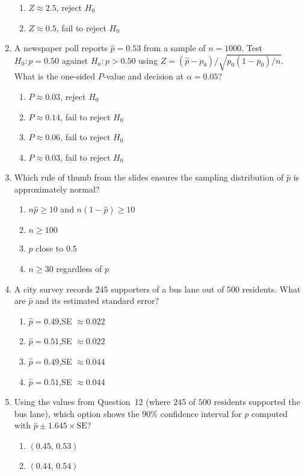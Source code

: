 \documentclass{article}
\begin{document}
\begin{enumerate}
\begin{enumerate}[label=(\Alph*)]
  \item $Z\approx2.5$, reject $H_0$
  \item $Z\approx0.5$, fail to reject $H_0$
  \end{enumerate}
\item A newspaper poll reports $\hat{p}=0.53$ from a sample of $n=1000$. Test $H_0:p=0.50$ against $H_a:p>0.50$ using $Z=(\hat{p}-p_0)/\sqrt{p_0(1-p_0)/n}$. What is the one-sided $P$-value and decision at $\alpha=0.05$?
  \begin{enumerate}[label=(\Alph*)]
  \item $P\approx0.03$, reject $H_0$
  \item $P\approx0.14$, fail to reject $H_0$
  \item $P\approx0.06$, fail to reject $H_0$
  \item $P\approx0.03$, fail to reject $H_0$
  \end{enumerate}
\item Which rule of thumb from the slides ensures the sampling distribution of $\hat{p}$ is approximately normal?
  \begin{enumerate}[label=(\Alph*)]
  \item $n\hat{p}\ge10$ and $n(1-\hat{p})\ge10$
  \item $n\ge100$
  \item $p$ close to $0.5$
  \item $n\ge30$ regardless of $p$
  \end{enumerate}
\item A city survey records $245$ supporters of a bus lane out of $500$ residents. What are $\hat{p}$ and its estimated standard error?
  \begin{enumerate}[label=(\Alph*)]
  \item $\hat{p}=0.49$,\quad SE $\approx0.022$
  \item $\hat{p}=0.51$,\quad SE $\approx0.022$
  \item $\hat{p}=0.49$,\quad SE $\approx0.044$
  \item $\hat{p}=0.51$,\quad SE $\approx0.044$
  \end{enumerate}
\item Using the values from Question~12 (where $245$ of $500$ residents supported the bus lane), which option shows the $90\%$ confidence interval for $p$ computed with $\hat{p}\pm1.645\times\text{SE}$?
  \begin{enumerate}[label=(\Alph*)]
  \item $(0.45,\,0.53)$
  \item $(0.44,\,0.54)$

\end{enumerate}
\end{enumerate}
\end{document}
